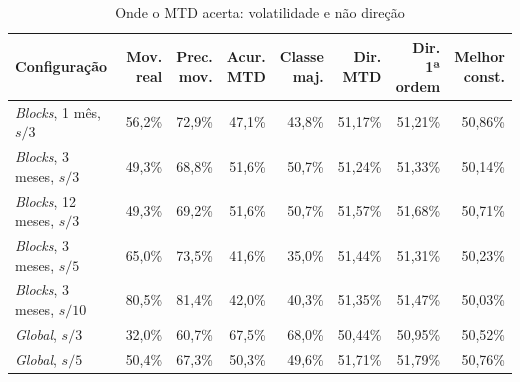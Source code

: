 \begin{table}[htb]
  \centering
  \caption{Onde o MTD acerta: volatilidade e não direção}
  \label{tab:mtd_volatilidade_direcao}
  \footnotesize
  \begin{tabular}{lrrrrrrr}
    \toprule
    Configuração & \shortstack[r]{Mov.\\real} & \shortstack[r]{Prec.\\mov.} & \shortstack[r]{Acur.\\MTD} & \shortstack[r]{Classe\\maj.} & \shortstack[r]{Dir.\\MTD} & \shortstack[r]{Dir. 1ª\\ordem} & \shortstack[r]{Melhor\\const.} \\
    \midrule
    \textit{Blocks}, 1 mês, $s/3$ & 56,2\% & 72,9\% & 47,1\% & 43,8\% & 51,17\% & 51,21\% & 50,86\% \\
    \textit{Blocks}, 3 meses, $s/3$ & 49,3\% & 68,8\% & 51,6\% & 50,7\% & 51,24\% & 51,33\% & 50,14\% \\
    \textit{Blocks}, 12 meses, $s/3$ & 49,3\% & 69,2\% & 51,6\% & 50,7\% & 51,57\% & 51,68\% & 50,71\% \\
    \textit{Blocks}, 3 meses, $s/5$ & 65,0\% & 73,5\% & 41,6\% & 35,0\% & 51,44\% & 51,31\% & 50,23\% \\
    \textit{Blocks}, 3 meses, $s/10$ & 80,5\% & 81,4\% & 42,0\% & 40,3\% & 51,35\% & 51,47\% & 50,03\% \\
    \textit{Global}, $s/3$ & 32,0\% & 60,7\% & 67,5\% & 68,0\% & 50,44\% & 50,95\% & 50,52\% \\
    \textit{Global}, $s/5$ & 50,4\% & 67,3\% & 50,3\% & 49,6\% & 51,71\% & 51,79\% & 50,76\% \\
    \bottomrule
  \end{tabular}
\end{table}

